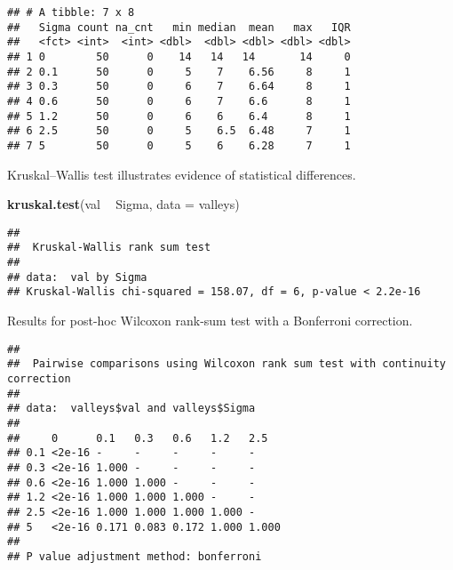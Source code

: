 \documentclass[]{book}
\newenvironment{Shaded}{\begin{snugshade}}{\end{snugshade}}
\newcommand{\DataTypeTok}[1]{\textcolor[rgb]{0.13,0.29,0.53}{#1}}
\newcommand{\KeywordTok}[1]{\textcolor[rgb]{0.13,0.29,0.53}{\textbf{#1}}}
\newcommand{\NormalTok}[1]{#1}
\newcommand{\OperatorTok}[1]{\textcolor[rgb]{0.81,0.36,0.00}{\textbf{#1}}}
\newcommand{\OtherTok}[1]{\textcolor[rgb]{0.56,0.35,0.01}{#1}}
\newcommand{\StringTok}[1]{\textcolor[rgb]{0.31,0.60,0.02}{#1}}
\begin{document}
\begin{verbatim}
## # A tibble: 7 x 8
##   Sigma count na_cnt   min median  mean   max   IQR
##   <fct> <int>  <int> <dbl>  <dbl> <dbl> <dbl> <dbl>
## 1 0        50      0    14   14   14       14     0
## 2 0.1      50      0     5    7    6.56     8     1
## 3 0.3      50      0     6    7    6.64     8     1
## 4 0.6      50      0     6    7    6.6      8     1
## 5 1.2      50      0     6    6    6.4      8     1
## 6 2.5      50      0     5    6.5  6.48     7     1
## 7 5        50      0     5    6    6.28     7     1
\end{verbatim}

Kruskal--Wallis test illustrates evidence of statistical differences.

\begin{Shaded}
\begin{Highlighting}[]
\KeywordTok{kruskal.test}\NormalTok{(val }\OperatorTok{~}\StringTok{ }\NormalTok{Sigma, }\DataTypeTok{data =}\NormalTok{ valleys)}
\end{Highlighting}
\end{Shaded}

\begin{verbatim}
## 
##  Kruskal-Wallis rank sum test
## 
## data:  val by Sigma
## Kruskal-Wallis chi-squared = 158.07, df = 6, p-value < 2.2e-16
\end{verbatim}

Results for post-hoc Wilcoxon rank-sum test with a Bonferroni correction.

\begin{Shaded}
\end{Shaded}

\begin{verbatim}
## 
##  Pairwise comparisons using Wilcoxon rank sum test with continuity correction 
## 
## data:  valleys$val and valleys$Sigma 
## 
##     0      0.1   0.3   0.6   1.2   2.5  
## 0.1 <2e-16 -     -     -     -     -    
## 0.3 <2e-16 1.000 -     -     -     -    
## 0.6 <2e-16 1.000 1.000 -     -     -    
## 1.2 <2e-16 1.000 1.000 1.000 -     -    
## 2.5 <2e-16 1.000 1.000 1.000 1.000 -    
## 5   <2e-16 0.171 0.083 0.172 1.000 1.000
## 
## P value adjustment method: bonferroni
\end{verbatim}
\end{document}
